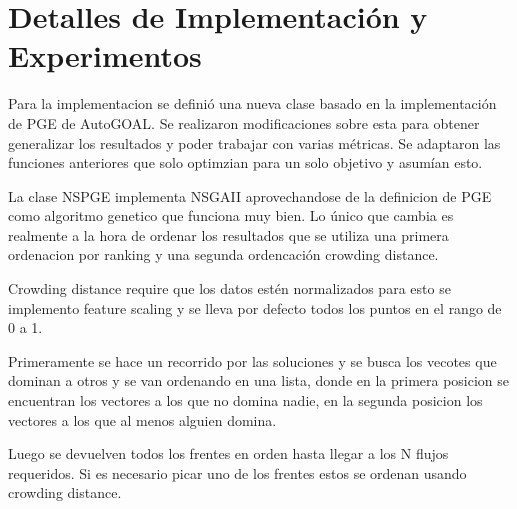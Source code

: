 \chapter{Detalles de Implementación y Experimentos}\label{chapter:implementation}


Para la implementacion se defini\'o una nueva clase basado en la implementaci\'on de PGE de AutoGOAL. 
Se realizaron modificaciones sobre esta para obtener generalizar los resultados y poder trabajar con varias m\'etricas. Se adaptaron las funciones anteriores que solo optimzian para un solo objetivo y asum\'ian esto.

La clase NSPGE implementa NSGAII aprovechandose de la definicion de PGE como algoritmo genetico que funciona muy bien. Lo \'unico que cambia es realmente a la hora de ordenar los resultados que se utiliza una primera ordenacion por ranking y una segunda ordencaci\'on crowding distance.

Crowding distance require que los datos est\'en normalizados para esto se implemento feature scaling y se lleva por defecto todos los puntos en el rango de 0 a 1.

Primeramente se hace un recorrido por las soluciones y se busca los vecotes que dominan a otros y se van ordenando en una lista, donde en la primera posicion se encuentran los vectores a los que no domina nadie, en la segunda posicion los vectores a los que al menos alguien domina.

Luego se devuelven todos los frentes en orden hasta llegar a los N flujos requeridos. Si es necesario picar uno de los frentes estos se ordenan usando crowding distance.



